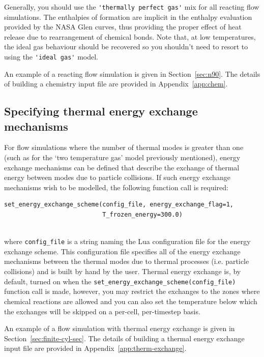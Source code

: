 \medskip
Generally, you should use the \verb!'thermally perfect gas'! mix for all reacting flow simulations.
The enthalpies of formation are implicit in the enthalpy evaluation provided by the NASA Glen curves,
thus providing the proper effect of heat release due to rearrangement of chemical bonds.
Note that, at low temperatures, the ideal gas behaviour should be recovered so you shouldn't need 
to resort to using the \verb!'ideal gas'! model.

\medskip
An example of a reacting flow simulation is given in Section~\ref{sec:n90}.
The details of building a chemistry input file are provided in Appendix~\ref{app:chem}.

\subsection{Specifying thermal energy exchange mechanisms}
For flow simulations where the number of thermal modes is greater than one (such as for the 
`two temperature gas' model previously
mentioned), energy exchange mechanisms can be defined that describe the exchange of thermal
energy between modes due to particle collisions.
If such energy exchange mechanisms wish to be modelled, the following function call is
required:\\
%
\topbar
\begin{verbatim}
set_energy_exchange_scheme(config_file, energy_exchange_flag=1, 
                           T_frozen_energy=300.0)\end{verbatim}
\bottombar\\
where \texttt{config\_file} is a string naming the Lua configuration file for the
energy exchange scheme.  This configuration file specifies all of the energy exchange 
mechanisms between the thermal modes due to thermal processes (i.e. particle collisions) 
and is built by hand by the user.
Thermal energy exchange is, by default, turned on when the
\texttt{set\_energy\_exchange\_scheme(config\_file)} function call is made, however,
you may restrict the exchanges to the zones where chemical reactions are allowed and you
can also set the temperature below which the exchanges will be skipped on a per-cell, per-timestep basis.

\medskip
An example of a flow simulation with thermal energy exchange is given in
Section~\ref{sec:finite-cyl-sec}.
The details of building a thermal energy exchange input file are provided in 
Appendix~\ref{app:therm-exchange}.

